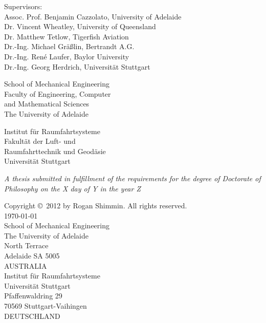 \begin{titlepage}
\begin{center}
  \small{Supervisors:\\
  Assoc. Prof. Benjamin Cazzolato, University of Adelaide\\
  Dr. Vincent Wheatley, University of Queensland\\
  Dr. Matthew Tetlow, Tigerfish Aviation\\
  Dr.-Ing. Michael Gr\"{a}\ss lin, Bertrandt A.G.\\
  Dr.-Ing. Ren\'{e} Laufer, Baylor University}\\
  Dr.-Ing. Georg Herdrich, Universit\"{a}t Stuttgart
  \end{center}

  \vfill

  \small{
  \begin{minipage}{0.5\textwidth}%
  School of Mechanical Engineering\\
  Faculty of Engineering, Computer\\ and Mathematical Sciences\\
  The University of Adelaide
  \end{minipage}
  \begin{minipage}{0.5\textwidth}%
  Institut f\"{u}r Raumfahrtsysteme\\
  Fakult\"{a}t der Luft- und\\ Raumfahrttechnik und Geod\"{a}sie\\
  Universit\"{a}t Stuttgart
  \end{minipage}}

  \vfill

  \center
  \emph{A thesis submitted in fulfillment of the requirements for the degree of Doctorate of Philosophy on the X day of Y in the year Z}

\end{titlepage}

\newpage\thispagestyle{empty}
{\setlength\parindent{0pt}

Copyright \copyright\ 2012 by Rogan Shimmin. All rights reserved.\\[2cm]

\today\\[2cm]

School of Mechanical Engineering\\
The University of Adelaide\\
North Terrace \\
Adelaide SA 5005\\
AUSTRALIA\\[2cm]

Institut f\"{u}r Raumfahrtsysteme\\
Universit\"{a}t Stuttgart\\
Pfaffenwaldring 29\\
70569 Stuttgart-Vaihingen\\
DEUTSCHLAND
}

